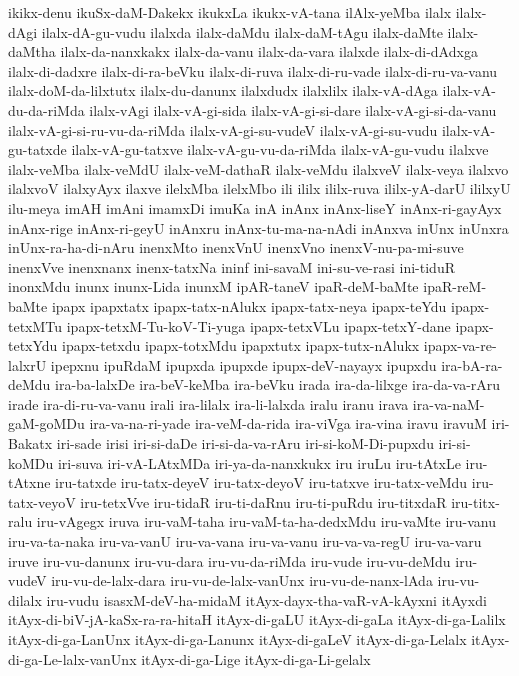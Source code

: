 {ikikx-denu
ikuSx-daM-Dakekx
ikukxLa
ikukx-vA-tana
ilAlx-yeMba
ilalx
ilalx-dAgi
ilalx-dA-gu-vudu
ilalxda
ilalx-daMdu
ilalx-daM-tAgu
ilalx-daMte
ilalx-daMtha
ilalx-da-nanxkakx
ilalx-da-vanu
ilalx-da-vara
ilalxde
ilalx-di-dAdxga
ilalx-di-dadxre
ilalx-di-ra-beVku
ilalx-di-ruva
ilalx-di-ru-vade
ilalx-di-ru-va-vanu
ilalx-doM-da-lilxtutx
ilalx-du-danunx
ilalxdudx
ilalxlilx
ilalx-vA-dAga
ilalx-vA-du-da-riMda
ilalx-vAgi
ilalx-vA-gi-sida
ilalx-vA-gi-si-dare
ilalx-vA-gi-si-da-vanu
ilalx-vA-gi-si-ru-vu-da-riMda
ilalx-vA-gi-su-vudeV
ilalx-vA-gi-su-vudu
ilalx-vA-gu-tatxde
ilalx-vA-gu-tatxve
ilalx-vA-gu-vu-da-riMda
ilalx-vA-gu-vudu
ilalxve
ilalx-veMba
ilalx-veMdU
ilalx-veM-dathaR
ilalx-veMdu
ilalxveV
ilalx-veya
ilalxvo
ilalxvoV
ilalxyAyx
ilaxve
ilelxMba
ilelxMbo
ili
ililx
ililx-ruva
ililx-yA-darU
ililxyU
ilu-meya
imAH
imAni
imamxDi
imuKa
inA
inAnx
inAnx-liseY
inAnx-ri-gayAyx
inAnx-rige
inAnx-ri-geyU
inAnxru
inAnx-tu-ma-na-nAdi
inAnxva
inUnx
inUnxra
inUnx-ra-ha-di-nAru
inenxMto
inenxVnU
inenxVno
inenxV-nu-pa-mi-suve
inenxVve
inenxnanx
inenx-tatxNa
ininf
ini-savaM
ini-su-ve-rasi
ini-tiduR
inonxMdu
inunx
inunx-Lida
inunxM
ipAR-taneV
ipaR-deM-baMte
ipaR-reM-baMte
ipapx
ipapxtatx
ipapx-tatx-nAlukx
ipapx-tatx-neya
ipapx-teYdu
ipapx-tetxMTu
ipapx-tetxM-Tu-koV-Ti-yuga
ipapx-tetxVLu
ipapx-tetxY-dane
ipapx-tetxYdu
ipapx-tetxdu
ipapx-totxMdu
ipapxtutx
ipapx-tutx-nAlukx
ipapx-va-re-lalxrU
ipepxnu
ipuRdaM
ipupxda
ipupxde
ipupx-deV-nayayx
ipupxdu
ira-bA-ra-deMdu
ira-ba-lalxDe
ira-beV-keMba
ira-beVku
irada
ira-da-lilxge
ira-da-va-rAru
irade
ira-di-ru-va-vanu
irali
ira-lilalx
ira-li-lalxda
iralu
iranu
irava
ira-va-naM-gaM-goMDu
ira-va-na-ri-yade
ira-veM-da-rida
ira-viVga
ira-vina
iravu
iravuM
iri-Bakatx
iri-sade
irisi
iri-si-daDe
iri-si-da-va-rAru
iri-si-koM-Di-pupxdu
iri-si-koMDu
iri-suva
iri-vA-LAtxMDa
iri-ya-da-nanxkukx
iru
iruLu
iru-tAtxLe
iru-tAtxne
iru-tatxde
iru-tatx-deyeV
iru-tatx-deyoV
iru-tatxve
iru-tatx-veMdu
iru-tatx-veyoV
iru-tetxVve
iru-tidaR
iru-ti-daRnu
iru-ti-puRdu
iru-titxdaR
iru-titx-ralu
iru-vAgegx
iruva
iru-vaM-taha
iru-vaM-ta-ha-dedxMdu
iru-vaMte
iru-vanu
iru-va-ta-naka
iru-va-vanU
iru-va-vana
iru-va-vanu
iru-va-va-regU
iru-va-varu
iruve
iru-vu-danunx
iru-vu-dara
iru-vu-da-riMda
iru-vude
iru-vu-deMdu
iru-vudeV
iru-vu-de-lalx-dara
iru-vu-de-lalx-vanUnx
iru-vu-de-nanx-lAda
iru-vu-dilalx
iru-vudu
isasxM-deV-ha-midaM
itAyx-dayx-tha-vaR-vA-kAyxni
itAyxdi
itAyx-di-biV-jA-kaSx-ra-ra-hitaH
itAyx-di-gaLU
itAyx-di-gaLa
itAyx-di-ga-Lalilx
itAyx-di-ga-LanUnx
itAyx-di-ga-Lanunx
itAyx-di-gaLeV
itAyx-di-ga-Lelalx
itAyx-di-ga-Le-lalx-vanUnx
itAyx-di-ga-Lige
itAyx-di-ga-Li-gelalx
}

